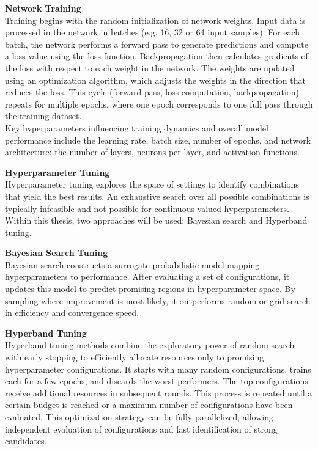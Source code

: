 \textbf{Network Training}\\
Training begins with the random initialization of network weights. Input data is processed in the network in batches (e.g. 16, 32 or 64 input samples). For each batch, the network performs a forward pass to generate predictions and compute a loss value using the loss function. Backpropagation then calculates gradients of the loss with respect to each weight in the network. The weights are updated using an optimization algorithm, which adjusts the weights in the direction that reduces the loss. This cycle (forward pass, loss computation, backpropagation) repeats for multiple epochs, where one epoch corresponds to one full pass through the training dataset. \\
Key hyperparameters influencing training dynamics and overall model performance include the learning rate, batch size, number of epochs, and network architecture: the number of layers, neurons per layer, and activation functions.

\textbf{Hyperparameter Tuning}\\
Hyperparameter tuning explores the space of settings to identify combinations that yield the best results. An exhaustive search over all possible combinations is typically infeasible and not possible for continuous-valued hyperparameters. Within this thesis, two approaches will be used: Bayesian search and Hyperband tuning.

\textbf{Bayesian Search Tuning}\\
Bayesian search constructs a surrogate probabilistic model mapping hyperparameters to performance. After evaluating a set of configurations, it updates this model to predict promising regions in hyperparameter space. By sampling where improvement is most likely, it outperforms random or grid search in efficiency and convergence speed.

\textbf{Hyperband Tuning}\\
Hyperband tuning methods combine the exploratory power of random search with early stopping to efficiently allocate resources only to promising hyperparameter configurations. It starts with many random configurations, trains each for a few epochs, and discards the worst performers. The top configurations receive additional resources in subsequent rounds. This process is repeated until a certain budget is reached or a maximum number of configurations have been evaluated. This optimization strategy can be fully parallelized, allowing independent evaluation of configurations and fast identification of strong candidates. 
\newpage
